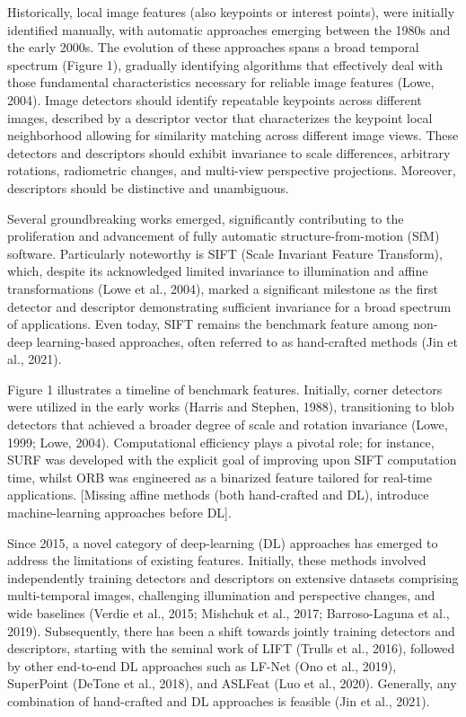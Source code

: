 Historically, local image features (also keypoints or interest points), were initially identified manually, with automatic approaches emerging between the 1980s and the early 2000s. The evolution of these approaches spans a broad temporal spectrum (Figure 1), gradually identifying algorithms that effectively deal with those fundamental characteristics necessary for reliable image features (Lowe, 2004). Image detectors should identify repeatable keypoints across different images, described by a descriptor vector that characterizes the keypoint local neighborhood allowing for similarity matching across different image views. These detectors and descriptors should exhibit invariance to scale differences, arbitrary rotations, radiometric changes, and multi-view perspective projections. Moreover, descriptors should be distinctive and unambiguous.  

Several groundbreaking works emerged, significantly contributing to the proliferation and advancement of fully automatic structure-from-motion (SfM) software. Particularly noteworthy is SIFT (Scale Invariant Feature Transform), which, despite its acknowledged limited invariance to illumination and affine transformations (Lowe et al., 2004), marked a significant milestone as the first detector and descriptor demonstrating sufficient invariance for a broad spectrum of applications. Even today, SIFT remains the benchmark feature among non-deep learning-based approaches, often referred to as hand-crafted methods (Jin et al., 2021). 

Figure 1 illustrates a timeline of benchmark features. Initially, corner detectors were utilized in the early works (Harris and Stephen, 1988), transitioning to blob detectors that achieved a broader degree of scale and rotation invariance (Lowe, 1999; Lowe, 2004). Computational efficiency plays a pivotal role; for instance, SURF was developed with the explicit goal of improving upon SIFT computation time, whilst ORB was engineered as a binarized feature tailored for real-time applications. [Missing affine methods (both hand-crafted and DL), introduce machine-learning approaches before DL]. 

Since 2015, a novel category of deep-learning (DL) approaches has emerged to address the limitations of existing features. Initially, these methods involved independently training detectors and descriptors on extensive datasets comprising multi-temporal images, challenging illumination and perspective changes, and wide baselines (Verdie et al., 2015; Mishchuk et al., 2017; Barroso-Laguna et al., 2019). Subsequently, there has been a shift towards jointly training detectors and descriptors, starting with the seminal work of LIFT (Trulls et al., 2016), followed by other end-to-end DL approaches such as LF-Net (Ono et al., 2019), SuperPoint (DeTone et al., 2018), and ASLFeat (Luo et al., 2020). Generally, any combination of hand-crafted and DL approaches is feasible (Jin et al., 2021). 

